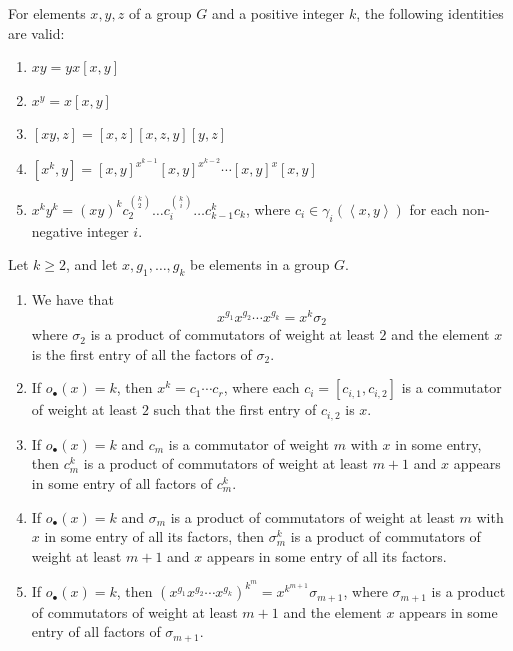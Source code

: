 \documentclass[10pt,a4paper]{amsart}
\begin{document}
\begin{lem}\label{prop_comm}
For elements $x, y, z$ of a group $G$ and a positive integer $k$, the following identities are valid:
\begin{enumerate}
\item $xy=yx[x,y]$
\item $x^y=x[x,y]$
    \item $[xy,z]=[x,z][x,z,y][y,z]$
    \item $[x^k,y]=[x,y]^{x^{k-1}}[x,y]^{x^{k-2}}\cdots [x,y]^x[x,y]$
   \item $x^ky^k=(xy)^kc_2^{\binom{k}{2}}\ldots c_i^{\binom{k}{i}}\ldots c_{k-1}^kc_k$, where $c_i\in \gamma_i(\left<x,y\right>)$ for each non-negative integer $i$.
\end{enumerate}
\end{lem}

\begin{lem} \label{lem:commutators-powers}
Let $k\geq 2$, and let $x, g_1,\ldots,g_k$ be elements in a group $G$.
\begin{enumerate}
    \item We have that  
    \[
    x^{g_1}x^{g_2}\cdots x^{g_k}=x^k\sigma_2
    \]
where $\sigma_2$ is a product of commutators of weight at least $2$ and the element $x$ is the first entry of all the factors of $\sigma_2$.
    \item If $o_{\bullet}(x)=k$, then  $x^{k}=c_1\cdots c_r$, where each $c_i=[c_{i,1},c_{i,2}]$ is a commutator of weight at least $2$ such that the first entry of $c_{i,2}$ is $x$.
    \item If $o_{\bullet}(x)=k$ and $c_m$ is a commutator of weight $m$ with $x$ in some entry, then $c_m^k$ is a product of commutators of weight at least $m+1$  and $x$ appears in some entry of all factors of $c_m^k$.
    \item If $o_{\bullet}(x)=k$ and $\sigma_m$ is a product of commutators of weight at least $m$ with $x$ in some entry of all its factors, then $\sigma_m^k$ is a product of commutators of weight at least $m+1$  and $x$ appears in some entry of all its factors.
    \item If $o_{\bullet}(x)=k$, then $(x^{g_1}x^{g_2}\cdots x^{g_k})^{k^m}=x^{k^{m+1}}\sigma_{m+1}$, where $\sigma_{m+1}$ is a product of commutators of weight at least $m+1$ and the element $x$ appears in some entry of all factors of $\sigma_{m+1}$.
  \end{enumerate}
\end{lem}
\end{document}
